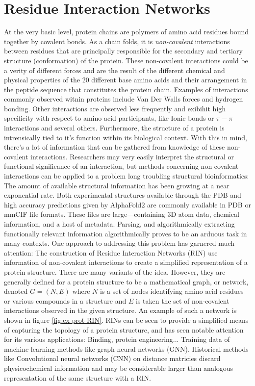 \section{Residue Interaction Networks}
At the very basic level, protein chains are polymers of amino acid residues bound together by covalent bonds. As a chain folds, it is \emph{non-covalent} interactions between residues that are principally responsible for the secondary and tertiary structure (conformation) of the protein. These non-covalent interactions could be a verity of different forces and are the result of the different chemical and physical properties of the 20 different base amino acids and their arrangement in the peptide sequence that constitutes the protein chain. 
Examples of interactions commonly observed witnin proteins include Van Der Walls forces and hydrogen bonding. Other interactions are observed less frequently and exibihit high specificity with respect to amino acid participants, like Ionic bonds or $\pi-\pi$ interactions and several others. 
Furthermore, the structure of a protein is intrensically tied to it's function within its biological context. %
With this in mind, there's a lot of information that can be gathered from knowledge of these non-covalent interactions. 
Researchers may very easily interpret the structural or functional significance of an interaction, but methods concerning non-covalent interactions can be applied to a problem long troubling structural bioinformatics: The amount of available structural information has been growing at a near exponential rate. %
Both experimental structures available through the PDB and high accuracy predictions given by AlphaFold2 are commonly available in PDB or mmCIF file formats. These files are large---containing 3D atom data, chemical information, and a host of metadata. Parsing, and algorithmically extracting functionally relevant information algorithmically proves to be an arduous task in many contexts. 
One approach to addressing this problem has garnered much attention: The construction of Residue Interaction Networks (RIN) use information of non-covalent interactions to create a simplified representation of a protein structure.
There are many variants of the idea. However, they are generally defined for a protein structure to be a mathematical graph, or network, denoted $G = (N, E)$ where $N$ is a set of nodes identifying amino acid residues or various compounds in a structure and $E$ is taken the set of non-covalent interactions observed in the given structure.
An example of such a network is shown in figure \ref{fig:ex-prot-RIN}. RINs can be seen to provide a simplified means of capturing the topology of a protein structure, and has seen notable attention for its various applications:
Binding, protein engineering... 
Training data of machine learning methods like graph neural networks (GNN). 
Historical methods like Convolutional neural networks (CNN) on distance matricies discard physicochemical information and may be considerable larger than analogous representation of the same structure with a RIN. 

